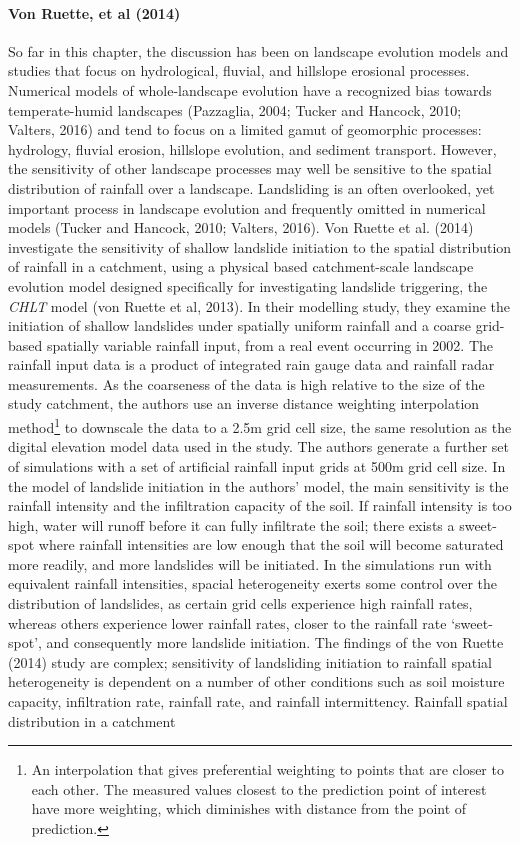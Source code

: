 \documentclass[12pt,oneside,PhD]{muthesis}
\begin{document}
\paragraph{Von Ruette, et al (2014)}

So far in this chapter, the discussion has been on landscape evolution models and studies that focus on hydrological, fluvial, and hillslope erosional processes. Numerical models of whole-landscape evolution have a recognized bias towards temperate-humid landscapes (Pazzaglia, 2004; Tucker and Hancock, 2010; Valters, 2016) and tend to focus on a limited gamut of geomorphic processes: hydrology, fluvial erosion, hillslope evolution, and sediment transport. However, the sensitivity of other landscape processes may well be sensitive to the spatial distribution of rainfall over a landscape. Landsliding is an often overlooked, yet important process in landscape evolution and frequently omitted in numerical models (Tucker and Hancock, 2010; Valters, 2016). Von Ruette et al. (2014) investigate the sensitivity of shallow landslide initiation to the spatial distribution of rainfall in a catchment, using a physical based catchment-scale landscape evolution model designed specifically for investigating landslide triggering, the \emph{CHLT} model (von Ruette et al, 2013). In their modelling study, they examine the initiation of shallow landslides under spatially uniform rainfall and a coarse grid-based spatially variable rainfall input, from a real event occurring in 2002. The rainfall input data is a product of integrated rain gauge data and rainfall radar measurements. As the coarseness of the data is high relative to the size of the study catchment, the authors use an inverse distance weighting interpolation method\footnote{An interpolation that gives preferential weighting to points that are closer to each other. The measured values closest to the prediction point of interest have more weighting, which diminishes with distance from the point of prediction.} to downscale the data to a 2.5m grid cell size, the same resolution as the digital elevation model data used in the study. The authors generate a further set of simulations with a set of artificial rainfall input grids at 500m grid cell size. In the model of landslide initiation in the authors' model, the main sensitivity is the rainfall intensity and the infiltration capacity of the soil. If rainfall intensity is too high, water will runoff before it can fully infiltrate the soil; there exists a sweet-spot where rainfall intensities are low enough that the soil will become saturated more readily, and more landslides will be initiated. In the simulations run with equivalent rainfall intensities, spacial heterogeneity exerts some control over the distribution of landslides, as certain grid cells experience high rainfall rates, whereas others experience lower rainfall rates, closer to the rainfall rate `sweet-spot', and consequently more landslide initiation. The findings of the von Ruette (2014) study are complex; sensitivity of landsliding initiation to rainfall spatial heterogeneity is dependent on a number of other conditions such as soil moisture capacity, infiltration rate, rainfall rate, and rainfall intermittency. Rainfall spatial distribution in a catchment 
\end{document}
